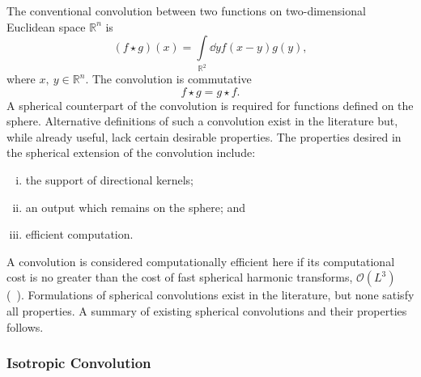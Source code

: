 The conventional convolution between two functions on two-dimensional Euclidean space \(\mathbb{R}^{n}\) is
%
\begin{equation}
	(f \star g)(x)
	= \int\limits_{\mathbb{R}^{2}} \dd{y} f(x-y) g(y),
\end{equation}
%
where \(x,\ y \in \mathbb{R}^{n}\).
The convolution is commutative
%
\begin{equation}
	f \star g
	= g \star f.
\end{equation}
%
A spherical counterpart of the convolution is required for functions defined on the sphere.
Alternative definitions of such a convolution exist in the literature but, while already useful, lack certain desirable properties.
The properties desired in the spherical extension of the convolution include:
%
\begin{enumerate}[(i),nosep,left=\parindent]
	\item the support of directional kernels;
	\item an output which remains on the sphere; and
	\item efficient computation.
\end{enumerate}
%
A convolution is considered computationally efficient here if its computational cost is no greater than the cost of fast spherical harmonic transforms, \ie{} \(\mathcal{O}(L^{3})\) (\eg{}~\cite{Driscoll1994,McEwen2011}).
Formulations of spherical convolutions exist in the literature, but none satisfy all properties.
A summary of existing spherical convolutions and their properties follows.

\subsubsection{Isotropic Convolution}

